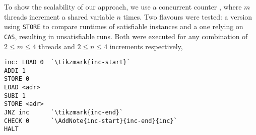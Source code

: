 To show the scalability of our approach, we  use a  concurrent counter , where $m$ threads increment a shared variable $n$ times.
Two flavours were tested: a  version using \lstinline[style=asm]{STORE} to compare runtimes of satisfiable instances and a  one relying on \lstinline[style=asm]{CAS}, resulting in unsatisfiable runs.
Both were executed for any combination of $2 \leq m \leq 4$ threads and $2 \leq n \leq 4$ increments respectively,

\begin{lstlisting}[style=asm, caption={\CHANGE{Faulty} Counter Template}, label={lst:count:buggy}, xleftmargin=0.39\textwidth]
inc: LOAD 0  `\tikzmark{inc-start}`
ADDI 1
STORE 0
LOAD <adr>
SUBI 1
STORE <adr>
JNZ inc      `\tikzmark{inc-end}`
CHECK 0      `\AddNote{inc-start}{inc-end}{inc}`
HALT
\end{lstlisting}

